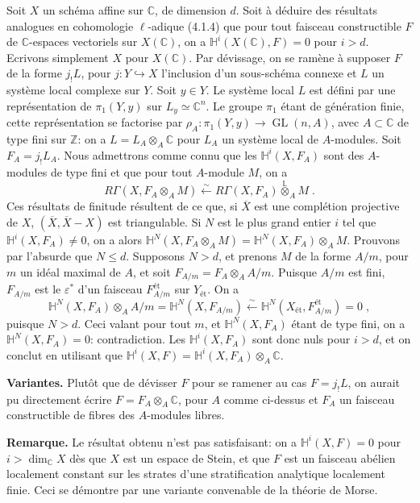 \documentclass[12pt,a4paper]{article}
\theoremstyle{plain}
\theoremstyle{definition}
\theoremstyle{remark}
\DeclareMathOperator{\GL}{GL}
\newcommand{\CC}{\mathbb{C}}
\newcommand{\HH}{\mathbb{H}}
\newcommand{\ZZ}{\mathbb{Z}}
\newcommand{\LL}{\mathbb{L}}
\begin{document}
Soit $X$ un sch\'ema affine sur $\CC$, de dimension $d$. Soit \`a d\'eduire des r\'esultats analogues en cohomologie $\ell$-adique (4.1.4) que pour tout faisceau constructible $F$ de $\CC$-espaces vectoriels sur $X(\CC)$, on a $\HH^i(X(\CC), F) = 0$ pour $i > d$. Ecrivons simplement $X$ pour $X(\CC)$. Par d\'evissage, on se ram\`ene \`a supposer $F$ de la forme $j_!L$, pour $j: Y \hookrightarrow X$ l'inclusion d'un sous-sch\'ema connexe et $L$ un syst\`eme local complexe sur $Y$. Soit $y \in Y$. Le syst\`eme local $L$ est d\'efini par une repr\'esentation de $\pi_1(Y, y)$ sur $L_y \simeq \CC^n$. Le groupe $\pi_1$ \'etant de g\'en\'eration finie, cette repr\'esentation se factorise par $\rho_A: \pi_1(Y, y) \to \GL(n, A)$, avec $A \subset \CC$ de type fini sur $\ZZ$: on a $L = L_A \otimes_A \CC$ pour $L_A$ un syst\`eme local de $A$-modules. Soit $F_A = j_!L_A$. Nous admettrons comme connu que les $\HH^i(X, F_A)$ sont des $A$-modules de type fini et que pour tout $A$-module $M$, on a
\[
R\Gamma(X, F_A \otimes_A M) \xleftarrow{\sim} R\Gamma(X, F_A) \overset{\LL}{\otimes}_A M\;.
\]
Ces r\'esultats de finitude r\'esultent de ce que, si $\overline{X}$ est une compl\'etion projective de $X$, $(\overline{X}, \overline{X} - X)$ est triangulable. Si $N$ est le plus grand entier $i$ tel que $\HH^i(X, F_A) \neq 0$, on a alors $\HH^N(X, F_A \otimes_A M) = \HH^N(X, F_A) \otimes_A M$. Prouvons par l'absurde que $N \leq d$. Supposons $N > d$, et prenons $M$ de la forme $A/m$, pour $m$ un id\'eal maximal de $A$, et soit $F_{A/m} = F_A \otimes_A A/m$. Puisque $A/m$ est fini, $F_{A/m}$ est le $\varepsilon^*$ d'un faisceau $F^{\text{\'et}}_{A/m}$ sur $Y_{\text{\'et}}$. On a
\[
\HH^N(X, F_A) \otimes_A A/m = \HH^N(X, F_{A/m}) \xleftarrow{\sim} \HH^N(X_{\text{\'et}}, F^{\text{\'et}}_{A/m}) = 0\;,
\]
puisque $N > d$. Ceci valant pour tout $m$, et $\HH^N(X, F_A)$ \'etant de type fini, on a $\HH^N(X, F_A) = 0$: contradiction. Les $\HH^i(X, F_A)$ sont donc nuls pour $i > d$, et on conclut en utilisant que $\HH^i(X, F) = \HH^i(X, F_A) \otimes_A \CC$.

\medskip
\noindent\textbf{Variantes.} Plut\^ot que de d\'evisser $F$ pour se ramener au cas $F = j_!L$, on aurait pu directement \'ecrire $F = F_A \otimes_A \CC$, pour $A$ comme ci-dessus et $F_A$ un faisceau constructible de fibres des $A$-modules libres.

\medskip
\noindent\textbf{Remarque.} Le r\'esultat obtenu n'est pas satisfaisant: on a $\HH^i(X, F) = 0$ pour $i > \dim_{\CC} X$ d\`es que $X$ est un espace de Stein, et que $F$ est un faisceau ab\'elien localement constant sur les strates d'une stratification analytique localement finie. Ceci se d\'emontre par une variante convenable de la th\'eorie de Morse.
\end{document}
